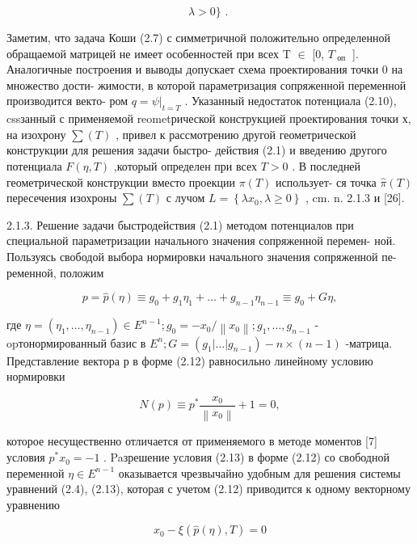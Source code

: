 \documentclass[10pt]{article}
\begin{document}
\[
\lambda  > 0\} \text{ . }
\]

Заметим, что задача Коши (2.7) с симметричной положительно определенной обращаемой матрицей не имеет особенностей при всех T \(\in\) [0, \({T}_{\text{ оп }}\) ]. Аналогичные построения и выводы допускает схема проектирования точки 0 на множество дости- жимости, в которой параметризация сопряженной переменной производится векто- ром \(q = {\left. \psi \right| }_{t = T}\) . Указанный недостаток потенциала (2.10), cssзанный с применяемой reometрической конструкцией проектирования точки х, на изохрону \(\sum \left( T\right)\) , привел к рассмотрению другой геометрической конструкции для решения задачи быстро- действия (2.1) и введению другого потенциала \(F\left( {\eta ,T}\right)\) ,который определен при всех \(T > 0\) . В последней геометрической конструкции вместо проекции \(\pi \left( T\right)\) использует- ся точка \(\widehat{\pi }\left( T\right)\) пересечения изохроны \(\sum \left( T\right)\) с лучом \(L = \left\{  {\lambda {x}_{0},\lambda  \geq  0}\right\}\) , cm. n. 2.1.3 и [26].

2.1.3. Решение задачи быстродействия (2.1) методом потенциалов при специальной параметризации начального значения сопряженной перемен- ной. Пользуясь свободой выбора нормировки начального значения сопряженной пе- ременной, положим

\[
p = \widehat{p}\left( \eta \right)  \equiv  {g}_{0} + {g}_{1}{\eta }_{1} + \ldots  + {g}_{n - 1}{\eta }_{n - 1} \equiv  {g}_{0} + {G\eta }, \tag{2.12}
\]

где \(\eta  = \left( {{\eta }_{1},\ldots ,{\eta }_{n - 1}}\right)  \in  {E}^{n - 1};{g}_{0} =  - {x}_{0}/\left\lVert {x}_{0} \right\rVert;{g}_{1},\ldots ,{g}_{n - 1}\) - opтонормированный базис в \({E}^{n};G = \left( {{g}_{1}\left| \ldots \right| {g}_{n - 1}}\right)  - n \times  \left( {n - 1}\right)\) -матрица. Представление вектора р в форме (2.12) равносильно линейному условию нормировки

\[
N\left( p\right)  \equiv  {p}^{ * }\frac{{x}_{0}}{\left\lVert {x}_{0} \right\rVert} + 1 = 0, \tag{2.13}
\]

которое несущественно отличается от применяемого в методе моментов [7] условия \({p}^{ * }{x}_{0} =  - 1\) . Paзрешение условия (2.13) в форме (2.12) со свободной переменной \(\eta  \in  {E}^{n - 1}\) оказывается чрезвычайно удобным для решения системы уравнений (2.4), (2.13), которая с учетом (2.12) приводится к одному векторному уравнению

\[
{x}_{0} - \xi \left( {\widehat{p}\left( \eta \right) ,T}\right)  = 0 \tag{2.14}
\]
\end{document}
